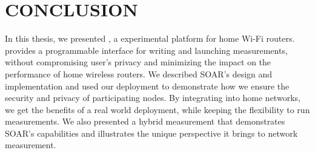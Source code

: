 \chapter{CONCLUSION}
\label{sec.conclusion}
In this thesis, we presented \sysname, a experimental platform for home Wi-Fi routers. \sysname provides a programmable interface for writing and launching measurements, without compromising user's privacy and minimizing the impact on the performance of home wireless routers. We described SOAR's design and implementation and used our deployment to demonstrate how we ensure the security and privacy of participating nodes. By integrating \sysname into home networks, we get the benefits of a real world deployment, while keeping the flexibility to run measurements. We also presented a hybrid measurement that demonstrates SOAR's capabilities and illustrates the unique perspective it brings to network measurement. 
